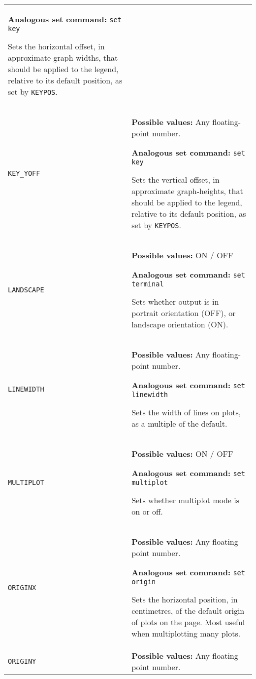 \begin{longtable}{p{3.4cm}p{9cm}}
                   \textbf{Analogous set command:} \texttt{set key}\index{set key command@\texttt{set key} command}

                   Sets the horizontal offset, in approximate graph-widths, that should be applied to the legend, relative to its default position, as set by \texttt{KEYPOS}.
                   \\
\texttt{KEY\_YOFF} & \textbf{Possible values:} Any floating-point number.

                   \textbf{Analogous set command:} \texttt{set key}\index{set key command@\texttt{set key} command}

                   Sets the vertical offset, in approximate graph-heights, that should be applied to the legend, relative to its default position, as set by \texttt{KEYPOS}.
                   \\
\texttt{LANDSCAPE} & \textbf{Possible values:} ON / OFF

                   \textbf{Analogous set command:} \texttt{set terminal}\index{set terminal command@\texttt{set terminal} command}

                   Sets whether output is in portrait orientation (OFF), or landscape orientation (ON).
                   \\
\texttt{LINEWIDTH} & \textbf{Possible values:} Any floating-point number.

                   \textbf{Analogous set command:} \texttt{set linewidth}\index{set linewidth command@\texttt{set linewidth} command}

                   Sets the width of lines on plots, as a  multiple of the default.
                   \\
\texttt{MULTIPLOT} & \textbf{Possible values:} ON / OFF

                   \textbf{Analogous set command:} \texttt{set multiplot}\index{set multiplot command@\texttt{set multiplot} command}

                   Sets whether multiplot mode is on or off.
                   \\
\texttt{ORIGINX} & \textbf{Possible values:} Any floating point number.

                   \textbf{Analogous set command:} \texttt{set origin}\index{set origin command@\texttt{set origin} command}

                   Sets the horizontal position, in centimetres, of the default origin of plots on the page. Most useful when multiplotting many plots.
                   \\
\texttt{ORIGINY} & \textbf{Possible values:} Any floating point number.


\end{longtable}
